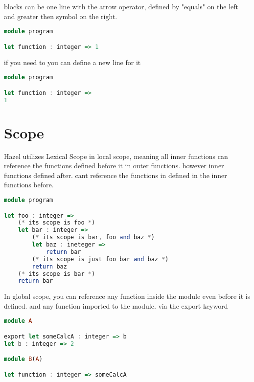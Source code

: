 \documentclass{article}
\begin{document}
blocks can be one line with the arrow operator, defined by "equals" on the left and greater then symbol on the right.

\begin{lstlisting}[language=Haskell]
module program

let function : integer => 1 
\end{lstlisting}

if you  need to you can define a new line for it 

\begin{lstlisting}[language=Haskell]
module program

let function : integer => 
1 
\end{lstlisting}


\section{Scope}

Hazel utilizes Lexical Scope in local scope, meaning all inner functions can reference the functions defined before it in outer functions. however inner functions defined after. cant reference the functions in defined in the inner functions before.

\begin{lstlisting}[language=Haskell]
module program

let foo : integer =>
    (* its scope is foo *) 
    let bar : integer =>
        (* its scope is bar, foo and baz *)
        let baz : ineteger => 
            return bar 
        (* its scope is just foo bar and baz *)
        return baz
    (* its scope is bar *)
    return bar
\end{lstlisting}

In global scope, you can reference any function inside the module even before it is defined. and any function imported to the module. via the export keyword

\begin{lstlisting}[language=Haskell]
module A

export let someCalcA : integer => b
let b : integer => 2

module B(A)

let function : integer => someCalcA 
\end{lstlisting}



\end{document}
